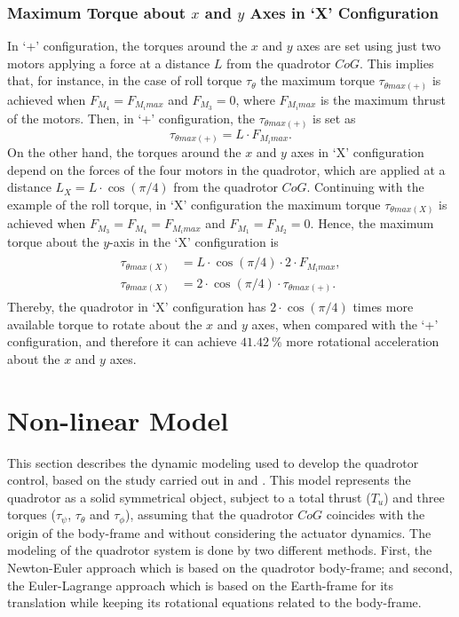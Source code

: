 \subsubsection{Maximum Torque about $x$ and $y$ Axes in `X' Configuration}
In `+' configuration, the torques around the $x$ and $y$ axes are set using just two motors applying a force at a distance $L$ from the quadrotor $CoG$. This implies that, for instance, in the case of roll torque $\tau_\theta$ the maximum torque $\tau_{\theta max (+)}$ is achieved when $F_{M_4} = F_{M_i max}$ and $F_{M_3} = 0$, where $F_{M_i max}$ is the maximum thrust of the motors. Then, in `+' configuration, the $\tau_{\theta max (+)}$ is set as
\begin{equation}
\tau_{\theta max (+)} = L\cdot F_{M_i max}.
\end{equation}
On the other hand, the torques around the $x$ and $y$ axes in `X' configuration depend on the forces of the four motors in the quadrotor, which are applied at a distance $L_{X} = L\cdot \cos(\pi/4)$ from the quadrotor $CoG$. Continuing with the example of the roll torque, in `X' configuration the maximum torque $\tau_{\theta max (X)}$ is achieved when $F_{M_3} = F_{M_4} = F_{M_i max}$ and $F_{M_1} = F_{M_2} = 0$. Hence, the maximum torque about the $y$-axis in the `X' configuration is
\begin{align}
\begin{split}
\tau_{\theta max (X)} & = L\cdot \cos(\pi/4) \cdot 2 \cdot F_{M_i max},\\[5px]
\tau_{\theta max (X)} & = 2\cdot \cos(\pi/4) \cdot \tau_{\theta max (+)}.
\end{split}
\end{align}
Thereby, the quadrotor in `X' configuration has $2\cdot \cos(\pi/4)$ times more available torque to rotate about the $x$ and $y$ axes, when compared with the `+' configuration, and therefore it can achieve $41.42\ \%$ more rotational acceleration about the $x$ and $y$ axes.


\section{Non-linear Model}
\label{sec:nonlinear}

This section describes the dynamic modeling used to develop the quadrotor control, based on the study carried out in \cite{Bouabdallah2007} and \cite{Bresciani2008}. This model represents the quadrotor as a solid symmetrical object, subject to a total thrust ($T_u$) and three torques ($\tau_\psi$, $\tau_\theta$ and $\tau_\phi$), assuming that the quadrotor $CoG$ coincides with the origin of the body-frame and without considering the actuator dynamics. The modeling of the quadrotor system is done by two different methods. First, the Newton-Euler approach which is based on the quadrotor body-frame; and second, the Euler-Lagrange approach which is based on the Earth-frame for its translation while keeping its rotational equations related to the body-frame.

